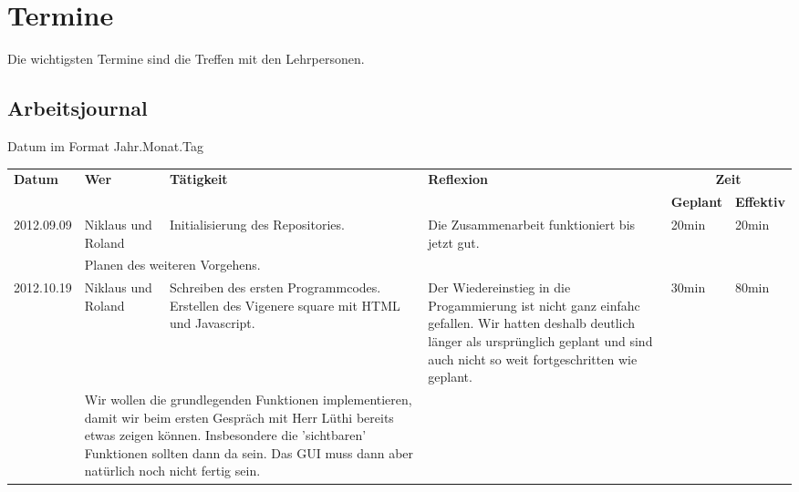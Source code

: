 \documentclass[11pt,paper=a4,final]{scrartcl}
\begin{document}
\section{Termine}
Die wichtigsten Termine sind die Treffen mit den Lehrpersonen.
\begin{landscape}
  \section{Arbeitsjournal}
  Datum im Format Jahr.Monat.Tag
  \begin{longtable}{|p{1.8cm}|p{1.5cm}|p{5.0cm}|p{11.0cm}|l|l|}
    \hline
    \multirow{2}{*}{\bf Datum} & \multirow{2}{*}{\bf Wer} &\multirow{2}{*}{\bf T\"atigkeit} & \multirow{2}{*}{\bf Reflexion} & \multicolumn{2}{c|}{\bf Zeit} \\ \cline{5-6}
     & & & & \bf Geplant & \bf Effektiv \\ \hline
    \hline
    \endhead
    2012.09.09 & Niklaus und Roland &
    Initialisierung des Repositories. &
    Die Zusammenarbeit funktioniert bis jetzt gut. &
    20min & 20min \\ \hline \nopagebreak
    \multicolumn{2}{|l|}{\bf Pendenzen} &\multicolumn{2}{p{16.0cm}|}{Planen des weiteren Vorgehens.}  & \multicolumn{2}{l|}{} \\ \hline
    \hline
    2012.10.19 & Niklaus und Roland &
    Schreiben des ersten Programmcodes. Erstellen des Vigenere square mit HTML und Javascript. &
    Der Wiedereinstieg in die Progammierung ist nicht ganz einfahc gefallen. Wir hatten deshalb deutlich l\"anger als urspr\"unglich geplant und sind auch nicht so weit fortgeschritten wie geplant. &
    30min & 80min \\ \hline \nopagebreak
    \multicolumn{2}{|l|}{\bf Pendenzen} &\multicolumn{2}{p{16.0cm}|}{Wir wollen die grundlegenden Funktionen implementieren, damit wir beim ersten Gespr\"ach mit Herr L\"uthi bereits etwas zeigen k\"onnen. Insbesondere die 'sichtbaren' Funktionen sollten dann da sein. Das GUI muss dann aber nat\"urlich noch nicht fertig sein.}  & \multicolumn{2}{l|}{} \\ \hline

\end{longtable}
\end{landscape}
\end{document}
